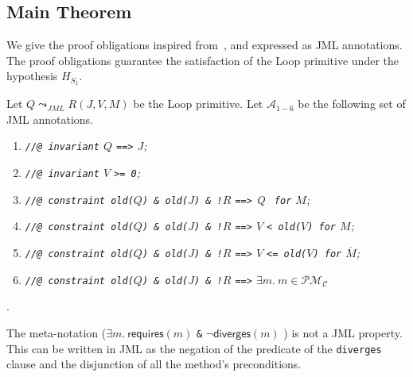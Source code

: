 \subsection{Main Theorem}%
\label{sec-OPLoop}

We give the proof
obligations inspired from~\cite{Abrial:1998:IDC,burstall}, and expressed as
JML annotations. The proof obligations guarantee 
the satisfaction of the \textsf{Loop}
primitive under the hypothesis $H_{S_1}$. 


Let \(Q \leadsto_{\mathit{JML}} R (J, V, M)\) be the \textsf{Loop}
primitive. Let $\mathcal{A}_{1-6}$ be the following set of JML annotations. 


\begin{small}
\begin{enumerate}
\item \emph{\texttt{//@ invariant} \(Q\) \texttt{==>} \(J\);}

\item \emph{\texttt{//@ invariant} \(V\) \texttt{>= 0};}

\item \emph{\texttt{//@ constraint \bsl old(}\(Q\)\texttt{) \& \bsl
old(}\(J\)\texttt{) \& !}\(R\) \texttt{\:==>\:} Q \texttt{
for} \(M\);}
\item \emph{\texttt{//@ constraint \bsl old(}\(Q\)\texttt{) \& \bsl
old(}\(J\)\texttt{) \& !}\(R\) \texttt{\:==>\:} \(V\) \texttt{< \bsl old(}\(V\)\texttt{)
for} \(M\);}

\item \emph{\texttt{//@ constraint \bsl old(}\(Q\)\texttt{) \& \bsl
old(}\(J\)\texttt{) \& !}\(R\) \texttt{\:==>\:} \(V\) \texttt{<= \bsl
old(}\(V\)\texttt{) for} \(\overline{M}\);}

\item \emph{\texttt{//@ constraint \bsl old(}\(Q\)\texttt{) \& \bsl 
old(}\(J\)\texttt{)  \& !}\(R\) \texttt{\:==>\:}   \(\exists m.\:  
m\in \mathcal{PM_C}\)} %
\end{enumerate}
\end{small}
.


The meta-notation (\(\exists m.\: \mathsf{requires}(m)\) \texttt{\&} \(\neg
\mathsf{diverges}(m)\) ) is not a JML property. This can be written in JML
as the negation of the predicate of the \texttt{diverges} clause and the
disjunction of all the method's preconditions.



